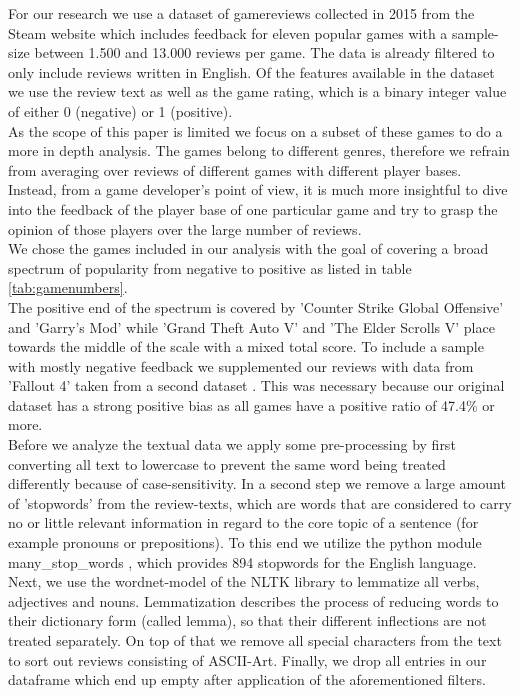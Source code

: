 \documentclass{article}
\theoremstyle{plain}
\theoremstyle{definition}
\theoremstyle{remark}
\begin{document}
For our research we use a dataset of gamereviews \cite{first_dataset} collected in 2015 from the Steam website which includes feedback for eleven popular games with a sample-size between 1.500 and 13.000 reviews per game. The data is already filtered to only include reviews written in English. Of the features available in the dataset we use the review text as well as the game rating, which is a binary integer value of either 0 (negative) or 1 (positive).
\\As the scope of this paper is limited we focus on a subset of these games to do a more in depth analysis. The games belong to different genres, therefore we refrain from averaging over reviews of different games with different player bases. Instead, from a game developer's point of view, it is much more insightful to dive into the feedback of the player base of one particular game and try to grasp the opinion of those players over the large number of reviews.\\
We chose the games included in our analysis with the goal of covering a broad spectrum of popularity from negative to positive as listed in table \ref{tab:gamenumbers}.\\ 
The positive end of the spectrum is covered by 'Counter Strike Global Offensive' and 'Garry’s Mod' while 'Grand Theft Auto V' and 'The Elder Scrolls V' place towards the middle of the scale with a mixed total score. To include a sample with mostly negative feedback we supplemented our reviews with data from 'Fallout 4' taken from a second dataset \cite{second_dataset}. This was necessary because our original dataset has a strong positive bias as all games have a positive ratio of 47.4\% or more. \\
Before we analyze the textual data we apply some pre-processing by first converting all text to lowercase to prevent the same word being treated differently because of case-sensitivity. In a second step we remove a large amount of 'stopwords' from the review-texts, which are words that are considered to carry no or little relevant information in regard to the core topic of a sentence (for example pronouns or prepositions). To this end we utilize the python module many\_stop\_words \cite{many_stop_words}, which provides 894 stopwords for the English language. Next, we use the wordnet-model of the NLTK library \cite{bird2009natural} to lemmatize all verbs, adjectives and nouns. Lemmatization describes the process of reducing words to their dictionary form (called lemma), so that their different inflections are not treated separately. On top of that we remove all special characters from the text to sort out reviews consisting of ASCII-Art. Finally, we drop all entries in our dataframe which end up empty after application of the aforementioned filters.\\
\end{document}
